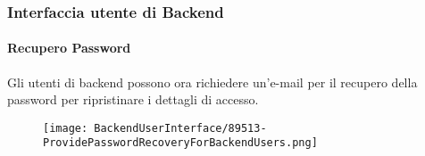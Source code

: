 
\begin{frame}[fragile]
	\frametitle{Interfaccia utente di Backend}
	\framesubtitle{Recupero Password}

	Gli utenti di backend possono ora richiedere un'e-mail per il recupero della password per ripristinare i dettagli di accesso.

	\begin{figure}
		\texttt{[image: BackendUserInterface/89513-ProvidePasswordRecoveryForBackendUsers.png]}
	\end{figure}

\end{frame}

